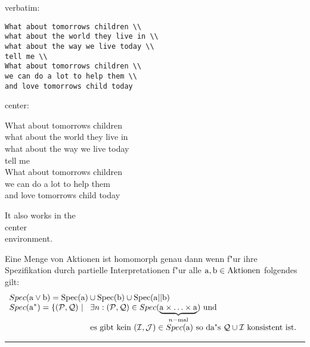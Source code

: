 \documentclass[twoside,11pt]{article}
\theoremstyle{lines}
\theoremstyle{longplain}
\def\akt{\rm}
\begin{document}
\begin{Lemma} verbatim:
\begin{verbatim}
What about tomorrows children \\
what about the world they live in \\
what about the way we live today \\
tell me \\
What about tomorrows children \\
we can do a lot to help them \\
and love tomorrows child today \end{verbatim}
\end{Lemma}
\begin{Lemma} center:
\begin{center}
What about tomorrows children \\
what about the world they live in \\
what about the way we live today \\
tell me \\
What about tomorrows children \\
we can do a lot to help them \\
and love tomorrows child today
\end{center}
\end{Lemma}
 \begin{XLemma*}\label{xxx}%
 \begin{center}
    It also works in the \\
    center \\
    environment.  
 \end{center}
 \end{XLemma*}

\begin{Satz}
Eine Menge von Aktionen ist homomorph genau dann wenn f"ur
ihre Spezifikation durch partielle Interpretationen f"ur alle
$\akt a,\akt b \in Aktionen$ folgendes gilt:
\[\begin{array}[b]{l}
  \displaystyle
  Spec(\akt a \lor \akt b) =
        Spec(\akt a) \cup Spec(\akt b) \cup Spec(\akt a || \akt b) \\
  \displaystyle
  Spec(\akt a^*) =  \{(\pl P,\pl Q) \st
    \begin{array}[t]{l}  \displaystyle
      \exists n:
      (\pl P,\pl Q) \in 
       Spec(\underbrace{\akt a \times \ldots \times \akt a}
             _{n-\mathrm{mal}}) \mbox { und} \\
      \displaystyle
      \mbox{es gibt kein } 
      (\pl I,\pl J) \in Spec(\akt a) \mbox{ so da"s }
      \pl Q \cup \pl I \mbox{ konsistent ist.} 
  \end{array}
\end{array} \]
\end{Satz}
\newdimen\dimenx
      \dimenx\prevdepth
      \rule{2pt}{\dimenx}%
\end{document}
